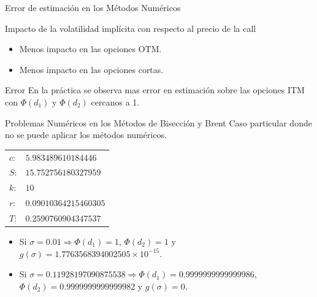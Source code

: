 \documentclass{beamer}
\begin{document}
\begin{frame}{Error de estimaci\'on en los M\'etodos Num\'ericos}

  \begin{block}{Impacto de la volatilidad impl\'icita con respecto al precio de la call}    
    \begin{itemize}
      \item Menos impacto en las opciones OTM.
      \item Menos impacto en las opciones cortas.
    \end{itemize}
  \end{block}

  \begin{block}{Error}
    En la pr\'actica se observa mas error en estimaci\'on sobre las opciones ITM con $\Phi(d_1)$ y
    $\Phi(d_2)$ cercanos a 1.
  \end{block}

\end{frame}

\begin{frame}{Problemas Num\'ericos en los M\'etodos de Bisecci\'on y Brent}
  Caso particular donde no se puede aplicar los m\'etodos num\'ericos.
  \begin{table}[!htbp]
    \centering
    \begin{tabular}{|ll|}
      \hline
      $c$: & $5.983489610184446$  \\ 
      $S$: & $15.752756180327959$  \\             %
      $k$: & $10$   \\ %
      $r$: & $0.09010364215460305$ \\               %
      $T$: & $0.2590760904347537$  \\ \hline
    \end{tabular}
  \end{table}

  \begin{itemize}
    \item Si $\sigma = 0.01 \Rightarrow \Phi(d_1) = 1$, $\Phi(d_2) = 1$ y $g(\sigma) = 1.7763568394002505\times10^{-15}$.
    \item Si $\sigma = 0.11928197090875538 \Rightarrow \Phi(d_1) = 0.9999999999999986$, $\Phi(d_2) = 0.9999999999999982$ y $g(\sigma) = 0$.
  \end{itemize}

\end{frame}
\end{document}
